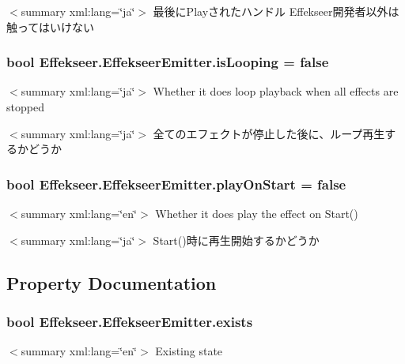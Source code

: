 $<$summary xml\-:lang=\char`\"{}ja\char`\"{}$>$ 最後に\-Playされたハンドル Effekseer開発者以外は触ってはいけない \hypertarget{class_effekseer_1_1_effekseer_emitter_a99a9a243268bc3fe5e8fa0ea70a85934}{
\subsubsection[{is\-Looping}]{\setlength{\rightskip}{0pt plus 5cm}bool Effekseer.\-Effekseer\-Emitter.\-is\-Looping = false}}\label{class_effekseer_1_1_effekseer_emitter_a99a9a243268bc3fe5e8fa0ea70a85934}
$<$summary xml\-:lang=\char`\"{}ja\char`\"{}$>$ Whether it does loop playback when all effects are stopped 

$<$summary xml\-:lang=\char`\"{}ja\char`\"{}$>$ 全てのエフェクトが停止した後に、ループ再生するかどうか \hypertarget{class_effekseer_1_1_effekseer_emitter_a1ab61ce092db278b2a445078e66a3330}{
\subsubsection[{play\-On\-Start}]{\setlength{\rightskip}{0pt plus 5cm}bool Effekseer.\-Effekseer\-Emitter.\-play\-On\-Start = false}}\label{class_effekseer_1_1_effekseer_emitter_a1ab61ce092db278b2a445078e66a3330}
$<$summary xml\-:lang=\char`\"{}en\char`\"{}$>$ Whether it does play the effect on Start() 

$<$summary xml\-:lang=\char`\"{}ja\char`\"{}$>$ Start()時に再生開始するかどうか 

\subsection{Property Documentation}
\hypertarget{class_effekseer_1_1_effekseer_emitter_ad45907c3a74d2c7d3c6e673788362577}{
\subsubsection[{exists}]{\setlength{\rightskip}{0pt plus 5cm}bool Effekseer.\-Effekseer\-Emitter.\-exists\hspace{0.3cm}{\ttfamily [get]}}}\label{class_effekseer_1_1_effekseer_emitter_ad45907c3a74d2c7d3c6e673788362577}
$<$summary xml\-:lang=\char`\"{}en\char`\"{}$>$ Existing state 

